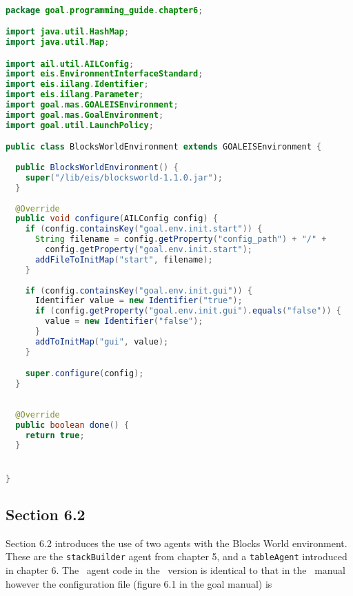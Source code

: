 \begin{ourexample}
\label{code:blocksworld} \quad \\
\begin{lstlisting}[basicstyle=\sffamily,language=Java,style=easslisting]
package goal.programming_guide.chapter6;

import java.util.HashMap;
import java.util.Map;

import ail.util.AILConfig;
import eis.EnvironmentInterfaceStandard;
import eis.iilang.Identifier;
import eis.iilang.Parameter;
import goal.mas.GOALEISEnvironment;
import goal.mas.GoalEnvironment;
import goal.util.LaunchPolicy;

public class BlocksWorldEnvironment extends GOALEISEnvironment {
	
  public BlocksWorldEnvironment() {
    super("/lib/eis/blocksworld-1.1.0.jar");		
  }
	
  @Override
  public void configure(AILConfig config) {
    if (config.containsKey("goal.env.init.start")) {
      String filename = config.getProperty("config_path") + "/" +
        config.getProperty("goal.env.init.start");
      addFileToInitMap("start", filename);
    }
		
    if (config.containsKey("goal.env.init.gui")) {
      Identifier value = new Identifier("true");
      if (config.getProperty("goal.env.init.gui").equals("false")) {
        value = new Identifier("false");
      }
      addToInitMap("gui", value);
    }

    super.configure(config);
  }
	
	
  @Override
  public boolean done() {
    return true;
  }


}
\end{lstlisting}
\end{ourexample}

\subsection{Section 6.2}
\label{sec:6.2}

Section 6.2 introduces the use of two agents with the Blocks World environment.  These are the \texttt{stackBuilder} agent from chapter 5, and a \texttt{tableAgent} introduced in chapter 6.  The \goal\ agent code in the \ail\ version is identical to that in the \goal\ manual however the configuration file (figure 6.1 in the goal manual) is

